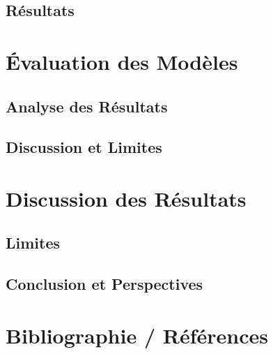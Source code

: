 \documentclass{rapport}
\begin{document}
\subsection{Résultats}

\section{Évaluation des Modèles}
\subsection{Analyse des Résultats}
\subsection{Discussion et Limites}

\section{Discussion des Résultats}
\subsection{Limites}
\subsection{Conclusion et Perspectives}

\section{Bibliographie / Références}



\end{document}
